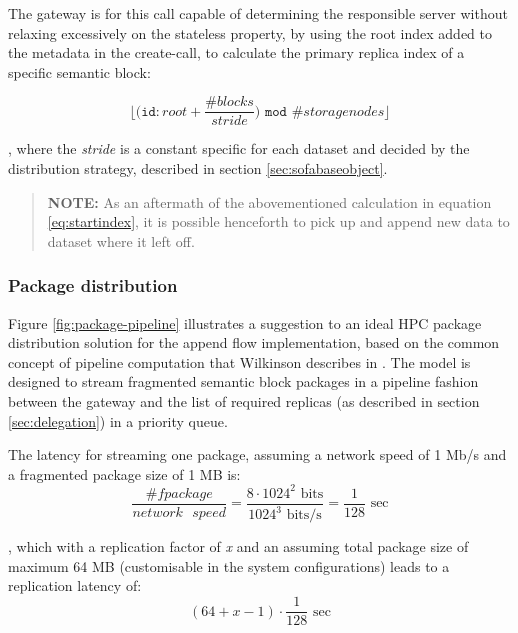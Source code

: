 The gateway is for this call capable of determining the responsible server without relaxing excessively on the stateless property, by using the root index added to the metadata in the create-call, to calculate the primary replica index of a specific semantic block:

\vspace*{2mm}
\begin{equation} \label{eq:startindex}
	\Big\lfloor\Big(\texttt{id}:root + \dfrac{\texttt{\#}blocks}{stride}\Big) \texttt{ mod } \texttt{\#}storagenodes\Big\rfloor
\end{equation}

, where the \textit{stride} is a constant specific for each dataset and decided by the distribution strategy, described in section \ref{sec:sofabaseobject}.

\begin{quotation}
	{\sffamily\textbf{NOTE:}} As an aftermath of the abovementioned calculation in equation \ref{eq:startindex}, it is possible henceforth to pick up and append new data to dataset where it left off.
\end{quotation}

\subsubsection*{Package distribution}
Figure \ref{fig:package-pipeline} illustrates a suggestion to an ideal HPC package distribution solution for the append flow implementation, based on the common concept of pipeline computation that Wilkinson \etal describes in \cite{Wilkinson:1998:PPT:289352}. The model is designed to stream fragmented semantic block packages in a pipeline fashion between the gateway and the list of required replicas (as described in section \ref{sec:delegation}) in a priority queue.
\newline

The latency for streaming one package, assuming a network speed of 1 Mb/s and a fragmented package size of 1 MB is:
\begin{equation}
	\dfrac{\texttt{\#}fpackage}{network\text{ }speed} = \dfrac{8\cdot 1024^2 \text{ bits}}{1024^3 \text{ bits/s}} = \dfrac{1}{128} \text{ sec}
\end{equation}

, which with a replication factor of \textit{x} and an assuming total package size of maximum 64 MB (customisable in the system configurations) leads to a replication latency of:
\begin{equation}
	(64 + x - 1) \cdot \dfrac{1}{128} \text{ sec}
\end{equation}


